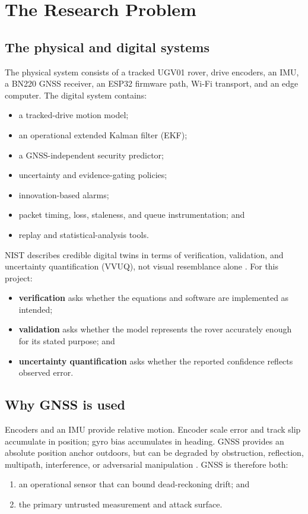 \documentclass[11pt,oneside]{book}
\begin{document}
\tableofcontents

\mainmatter

\chapter{The Research Problem}

\section{The physical and digital systems}

The physical system consists of a tracked UGV01 rover, drive encoders, an IMU,
a BN220 GNSS receiver, an ESP32 firmware path, Wi-Fi transport, and an edge
computer. The digital system contains:
\begin{itemize}
  \item a tracked-drive motion model;
  \item an operational extended Kalman filter (EKF);
  \item a GNSS-independent security predictor;
  \item uncertainty and evidence-gating policies;
  \item innovation-based alarms;
  \item packet timing, loss, staleness, and queue instrumentation; and
  \item replay and statistical-analysis tools.
\end{itemize}

NIST describes credible digital twins in terms of verification, validation,
and uncertainty quantification (VVUQ), not visual resemblance alone
\cite{shao2023credibility,nistDT}. For this project:
\begin{itemize}
  \item \textbf{verification} asks whether the equations and software are
  implemented as intended;
  \item \textbf{validation} asks whether the model represents the rover
  accurately enough for its stated purpose; and
  \item \textbf{uncertainty quantification} asks whether the reported
  confidence reflects observed error.
\end{itemize}

\section{Why GNSS is used}

Encoders and an IMU provide relative motion. Encoder scale error and track slip
accumulate in position; gyro bias accumulates in heading. GNSS provides an
absolute position anchor outdoors, but can be degraded by obstruction,
reflection, multipath, interference, or adversarial manipulation
\cite{groves2013,psiaki2016}. GNSS is therefore both:
\begin{enumerate}
  \item an operational sensor that can bound dead-reckoning drift; and
  \item the primary untrusted measurement and attack surface.
\end{enumerate}
\end{document}
